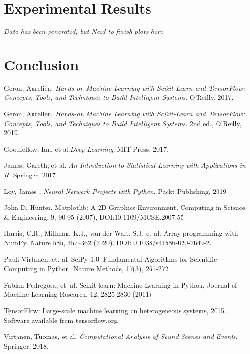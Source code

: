 \documentclass{IEEEtran}
\begin{document}
\section{Experimental Results}

\textit{Data has been generated, but Need to finish plots here}

\section{Conclusion}  


\begin{thebibliography}{9}


Geron, Aurelien. \textit{Hands-on Machine Learning with Scikit-Learn and TensorFlow: Concepts, Tools, and Techniques to Build Intelligent Systems}. O'Reilly, 2017.

Geron, Aurelien. \textit{Hands-on Machine Learning with Scikit-Learn and TensorFlow: Concepts, Tools, and Techniques to Build Intelligent Systems}. 2nd ed., O'Reilly, 2019.

Goodfellow, Ian, et al.\textit{Deep Learning}. MIT Press, 2017.

James, Gareth, et al. \textit{An Introduction to Statistical Learning with Applications in R}. Springer, 2017.

Loy, James , \textit{Neural Network Projects with Python}. Packt Publishing, 2019

John D. Hunter. Matplotlib: A 2D Graphics Environment, Computing in Science \& Engineering, 9, 90-95 (2007), DOI:10.1109/MCSE.2007.55

Harris, C.R., Millman, K.J., van der Walt, S.J. et al. Array programming with NumPy. Nature 585, 357–362 (2020). DOI: 0.1038/s41586-020-2649-2. 

Pauli Virtanen, et. al. SciPy 1.0: Fundamental Algorithms for Scientific Computing in Python. Nature Methods, 17(3), 261-272.

Fabian Pedregosa, et. al. Scikit-learn: Machine Learning in Python, Journal of Machine Learning Research, 12, 2825-2830 (2011) 

TensorFlow: Large-scale machine learning on heterogeneous systems,
2015. Software available from tensorflow.org.

Virtanen, Tuomas, et al. \textit{Computational Analysis of Sound Scenes and Events.} Springer, 2018.

\end{thebibliography}

\end{document}
